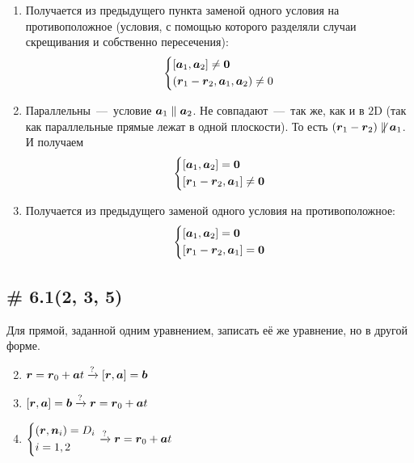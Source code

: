 \documentclass[a4paper,12pt]{article}
\begin{document}
\begin{solution}
\begin{enumerate}
      \item Получается из предыдущего пункта заменой одного условия на противоположное (условия, с помощью которого разделяли случаи скрещивания и собственно пересечения):
      \[
        \left\{
          \begin{aligned}
            &[\boldsymbol a_1, \boldsymbol a_2] \not= \boldsymbol 0\\
            &(\boldsymbol r_1 - \boldsymbol r_2, \boldsymbol a_1, \boldsymbol a_2) \not= 0
          \end{aligned}
        \right.
      \]
      
      \item Параллельны~---~условие $\bds a_1 \hm\parallel \bds a_2$.
      Не совпадают~---~так же, как и в $2$D (так как параллельные прямые лежат в одной плоскости).
      То есть $(\bds r_1 \hm- \bds r_2) \hm{\not\parallel} \bds a_1$.
      И получаем
      \[
        \left\{
          \begin{aligned}
            &[\boldsymbol a_1, \boldsymbol a_2] = \boldsymbol 0\\
            &[\boldsymbol r_1 - \boldsymbol r_2, \boldsymbol a_1] \not= \boldsymbol 0
          \end{aligned}
        \right.
      \]
      
      \item Получается из предыдущего заменой одного условия на противоположное:
      \[
        \left\{
          \begin{aligned}
            &[\boldsymbol a_1, \boldsymbol a_2] = \boldsymbol 0\\
            &[\boldsymbol r_1 - \boldsymbol r_2, \boldsymbol a_1] = \boldsymbol 0
          \end{aligned}
        \right.
      \]
    \end{enumerate}
  \end{solution}
  
  
  \subsection{\# 6.1(2, 3, 5)}
  
  \begin{problem}
    Для прямой, заданной одним уравнением, записать её же уравнение, но в другой форме.
    \begin{enumerate}
      \setcounter{enumi}{1}
      
      \item $\boldsymbol r = \boldsymbol r_0 + \boldsymbol a t \xrightarrow{\operatorname{?}} [\boldsymbol r, \boldsymbol a] = \boldsymbol b$
      
      \item $[\boldsymbol r, \boldsymbol a] = \boldsymbol b \xrightarrow{\operatorname{?}} \boldsymbol r = \boldsymbol r_0 + \boldsymbol a t$
      
      \setcounter{enumi}{4}
      
      \item $\left\{
        \begin{aligned}
          &(\boldsymbol r, \boldsymbol n_i) = D_i\\
          &i = 1, 2
        \end{aligned}
      \right. \xrightarrow{\operatorname{?}} \boldsymbol r = \boldsymbol r_0 + \boldsymbol a t$
    \end{enumerate}
  \end{problem}
  
\end{document}
